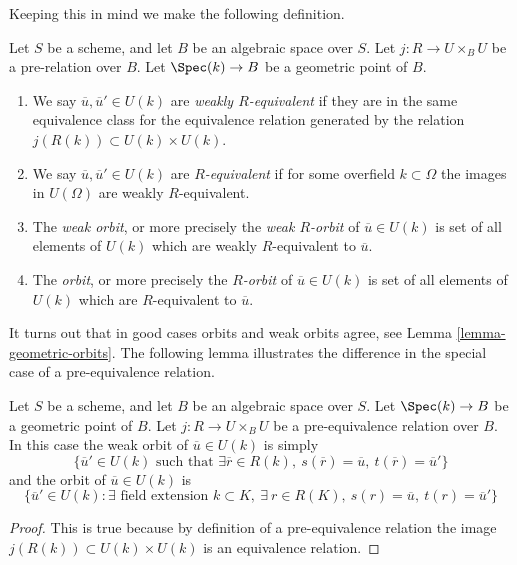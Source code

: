 \medskip\noindent
Keeping this in mind we make the following definition.

\begin{definition}
\label{definition-geometric-orbits}
Let $S$ be a scheme, and let $B$ be an algebraic space over $S$.
Let $j : R \to U \times_B U$ be a pre-relation over $B$.
Let $\Spec(k) \to B$ be a geometric point of $B$.
\begin{enumerate}
\item We say $\overline{u}, \overline{u}' \in U(k)$ are
{\it weakly $R$-equivalent} if they are in the same equivalence class
for the equivalence relation generated by the relation
$j(R(k)) \subset U(k) \times U(k)$.
\item We say $\overline{u}, \overline{u}' \in U(k)$ are
{\it $R$-equivalent} if for some overfield $k \subset \Omega$
the images in $U(\Omega)$ are weakly $R$-equivalent.
\item The {\it weak orbit}, or more precisely the {\it weak $R$-orbit}
of $\overline{u} \in U(k)$ is set of all
elements of $U(k)$ which are weakly $R$-equivalent to $\overline{u}$.
\item The {\it orbit}, or more precisely the {\it $R$-orbit}
of $\overline{u} \in U(k)$ is set of all
elements of $U(k)$ which are $R$-equivalent to $\overline{u}$.
\end{enumerate}
\end{definition}

\noindent
It turns out that in good cases orbits and weak orbits agree, see
Lemma \ref{lemma-geometric-orbits}. The following lemma illustrates
the difference in the special case of a pre-equivalence relation.

\begin{lemma}
\label{lemma-weak-orbit-pre-equivalence}
Let $S$ be a scheme, and let $B$ be an algebraic space over $S$.
Let $\Spec(k) \to B$ be a geometric point of $B$.
Let $j : R \to U \times_B U$ be a pre-equivalence relation over $B$.
In this case the weak orbit of $\overline{u} \in U(k)$ is simply
$$
\{
\overline{u}' \in U(k)
\text{ such that }
\exists \overline{r} \in R(k),
\ s(\overline{r}) = \overline{u},
\ t(\overline{r}) = \overline{u}'
\}
$$
and the orbit of $\overline{u} \in U(k)$ is
$$
\{
\overline{u}' \in U(k) :
\exists\text{ field extension }k \subset K, \ \exists\ r \in R(K),
\ s(r) = \overline{u}, \ t(r) = \overline{u}'\}
$$
\end{lemma}

\begin{proof}
This is true because by definition of a pre-equivalence relation the image
$j(R(k)) \subset U(k) \times U(k)$ is an equivalence relation.
\end{proof}

